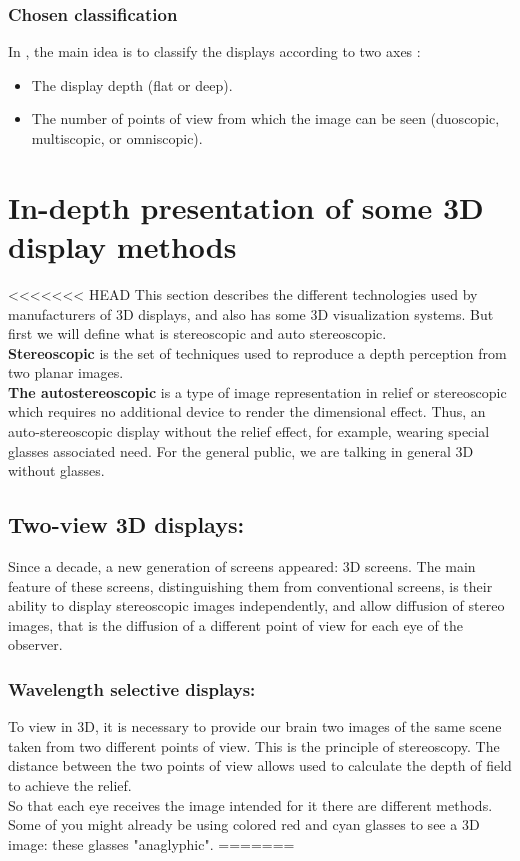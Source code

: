 \subsubsection{Chosen classification}
In \cite{pimenta2012comprehensive}, the main idea is to classify the displays according to two axes : 

\begin{itemize}
\item The display depth (flat or deep).
\item The number of points of view from which the image can be seen (duoscopic, multiscopic, or omniscopic).
\end{itemize}

\section{In-depth presentation of some 3D display methods}
<<<<<<< HEAD
This section describes the different technologies used by manufacturers of 3D displays, and also has some 3D visualization systems. But first we will define what is stereoscopic and auto stereoscopic.\\
\textbf{Stereoscopic} is the set of techniques used to reproduce a depth perception from two planar images.\\
\textbf{The autostereoscopic} is a type of image representation in relief or stereoscopic which requires no additional device to render the dimensional effect. Thus, an auto-stereoscopic display without the relief effect, for example, wearing special glasses associated need. For the general public, we are talking in general 3D without glasses.

\subsection{Two-view 3D displays:}
Since a decade, a new generation of screens appeared: 3D screens. The main feature of these screens, distinguishing them from conventional screens, is their ability to display stereoscopic images independently, and allow diffusion of stereo images, that is the diffusion of a different point of view for each eye of the observer.
\subsubsection{Wavelength selective displays:}
To view in 3D, it is necessary to provide our brain two images of the same scene taken from two different points of view. This is the principle of stereoscopy. The distance between the two points of view allows used to calculate the depth of field to achieve the relief.\\
So that each eye receives the image intended for it there are different methods. Some of you might already be using colored red and cyan glasses to see a 3D image: these glasses "anaglyphic".
=======
